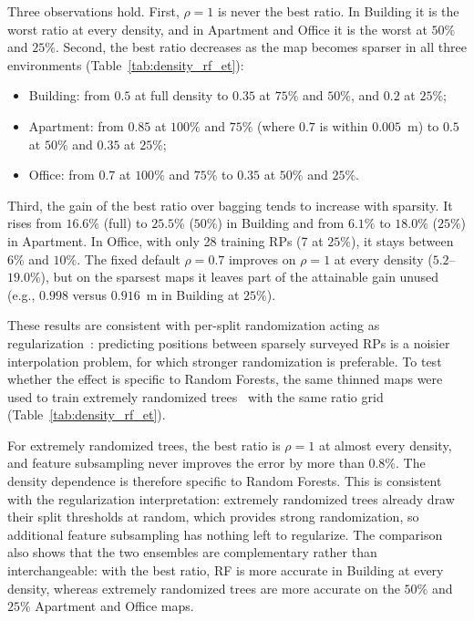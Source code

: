 Three observations hold. First, $\rho=1$ is never the best ratio. In Building it is the worst ratio at every density, and in Apartment and Office it is the worst at $50\%$ and $25\%$. Second, the best ratio decreases as the map becomes sparser in all three environments (Table~\ref{tab:density_rf_et}):
\begin{itemize}
	\item Building: from $0.5$ at full density to $0.35$ at $75\%$ and $50\%$, and $0.2$ at $25\%$;
	\item Apartment: from $0.85$ at $100\%$ and $75\%$ (where $0.7$ is within $0.005$~m) to $0.5$ at $50\%$ and $0.35$ at $25\%$;
	\item Office: from $0.7$ at $100\%$ and $75\%$ to $0.35$ at $50\%$ and $25\%$.
\end{itemize}
Third, the gain of the best ratio over bagging tends to increase with sparsity. It rises from $16.6\%$ (full) to $25.5\%$ ($50\%$) in Building and from $6.1\%$ to $18.0\%$ ($25\%$) in Apartment. In Office, with only 28 training RPs (7 at $25\%$), it stays between $6\%$ and $10\%$. The fixed default $\rho=0.7$ improves on $\rho=1$ at every density ($5.2$--$19.0\%$), but on the sparsest maps it leaves part of the attainable gain unused (e.g., $0.998$ versus $0.916$~m in Building at $25\%$).

These results are consistent with per-split randomization acting as regularization~\cite{mentch2020randomization}: predicting positions between sparsely surveyed RPs is a noisier interpolation problem, for which stronger randomization is preferable. To test whether the effect is specific to Random Forests, the same thinned maps were used to train extremely randomized trees~\cite{geurts2006extremely} with the same ratio grid (Table~\ref{tab:density_rf_et}).



For extremely randomized trees, the best ratio is $\rho=1$ at almost every density, and feature subsampling never improves the error by more than $0.8\%$. The density dependence is therefore specific to Random Forests. This is consistent with the regularization interpretation: extremely randomized trees already draw their split thresholds at random, which provides strong randomization, so additional feature subsampling has nothing left to regularize. The comparison also shows that the two ensembles are complementary rather than interchangeable: with the best ratio, RF is more accurate in Building at every density, whereas extremely randomized trees are more accurate on the $50\%$ and $25\%$ Apartment and Office maps.

